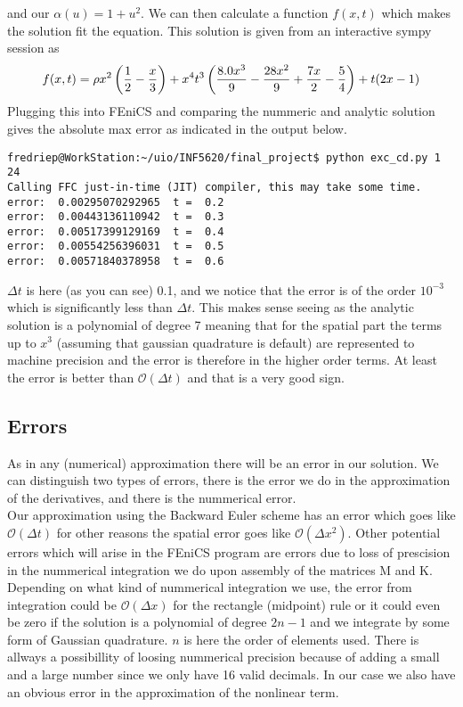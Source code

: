 \documentclass[a4paper,english, 10pt, twoside]{article}
\begin{document}
and our $\alpha(u) = 1+u^2$. We can then calculate a function $f(x,t)$ which makes the solution fit the equation. This solution is given from an 
interactive sympy session as 
\begin{equation}
 f(x,t) = \rho x^2\left({1\over2}-{x\over3}\right) +x^4t^3\left({8.0x^3\over9} -{28x^2\over9} +{7x\over2} -{5\over4}\right) +t(2x -1)
\end{equation}
Plugging this into FEniCS and comparing the nummeric and analytic solution gives the absolute max error as indicated in the output below.
\begin{lstlisting}
fredriep@WorkStation:~/uio/INF5620/final_project$ python exc_cd.py 1 24
Calling FFC just-in-time (JIT) compiler, this may take some time.
error:  0.00295070292965  t =  0.2
error:  0.00443136110942  t =  0.3
error:  0.00517399129169  t =  0.4
error:  0.00554256396031  t =  0.5
error:  0.00571840378958  t =  0.6
\end{lstlisting}
$\Delta t$ is here (as you can see) 0.1, and we notice that the error is of the order $10^{-3}$ which is significantly less than $\Delta t$. This 
makes sense seeing as the analytic solution is a polynomial of degree 7 meaning that for the spatial part the terms up to $x^3$ (assuming that 
gaussian quadrature is default) are represented to machine precision and the error is therefore in the higher order terms. At least the error is 
better than $\mathcal{O}(\Delta t)$ and that is a very good sign.

\subsection{Errors}
As in any (numerical) approximation there will be an error in our solution. We can distinguish two types of errors, there is the error we do in 
the approximation of the derivatives, and there is the nummerical error.\\
Our approximation using the Backward Euler scheme has an error which goes like $\mathcal{O}(\Delta t)$ for other reasons the spatial error goes 
like $\mathcal{O}(\Delta x^2)$. Other potential errors which will arise in the FEniCS program are errors due to loss of prescision in the 
nummerical integration we do upon assembly of the matrices M and K. Depending on what kind of nummerical integration we use, the error from integration 
could be $\mathcal{O}(\Delta x)$ for the rectangle (midpoint) rule or it could even be zero if the solution is a polynomial of degree $2n-1$ 
and we integrate by some form of Gaussian quadrature. $n$ is here the order of elements used.
There is allways a possibillity of loosing nummerical precision because of adding a small and a large number since we only have 16 valid decimals.
In our case we also have an obvious error in the approximation of the nonlinear term. 
\end{document}
